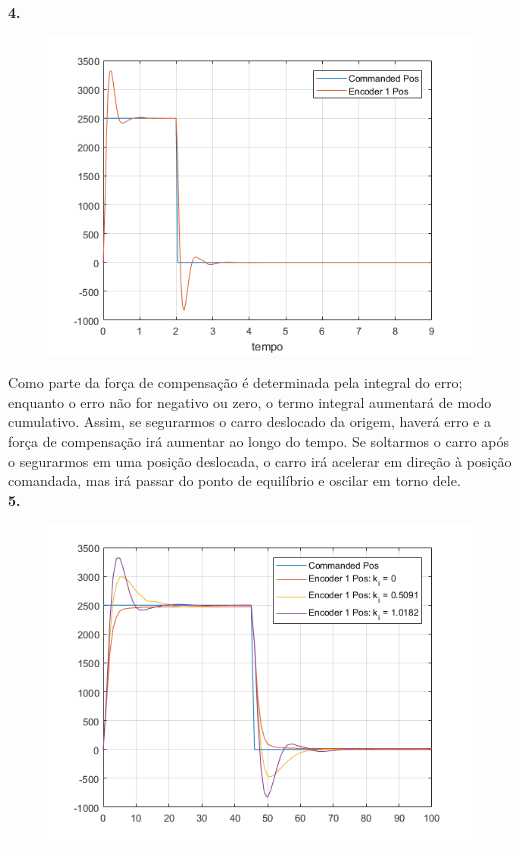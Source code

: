 \documentclass[a4paper,11pt]{article}
\begin{document}
\textbf{4.}

\begin{figure}[H]
\includegraphics[scale=0.9]{q04}
\centering
\end{figure}

Como parte da força de compensação é determinada pela integral do erro; enquanto
o erro não for negativo ou zero, o termo integral aumentará de modo cumulativo.
Assim, se segurarmos o carro deslocado da origem, haverá erro e a força de
compensação irá aumentar ao longo do tempo. Se soltarmos o carro após o
segurarmos em uma posição deslocada, o carro irá acelerar em direção à posição
comandada, mas irá passar do ponto de equilíbrio e oscilar em torno dele. \\

\textbf{5.}

\begin{figure}[H]
\includegraphics{q05}
\centering
\end{figure}
\end{document}

